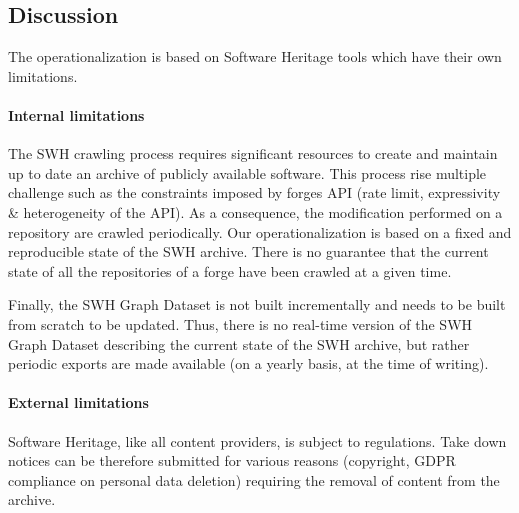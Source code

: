 \subsection{Discussion} 
\label{sec:discussion}
The operationalization is based on Software Heritage tools which have their own limitations.

\paragraph{Internal limitations}
The SWH crawling process requires significant resources to create and maintain up to date an archive of publicly available software. This process rise multiple challenge such as the constraints imposed by forges API (rate limit, expressivity \& heterogeneity of the API). As a consequence, the modification performed on a repository are crawled periodically. Our operationalization is based on a fixed and reproducible state of the SWH archive. There is no guarantee that the current state of all the repositories of a forge have been crawled at a given time.

Finally, the SWH Graph Dataset is not built incrementally and needs to be built from scratch to be updated. Thus, there is no real-time version of the SWH Graph Dataset describing the current state of the SWH archive, but rather periodic exports are made available (on a yearly basis, at the time of writing). 

\paragraph{External limitations}
Software Heritage, like all content providers, is subject to regulations. Take down notices can be therefore submitted for various reasons (copyright, GDPR compliance on personal data deletion) requiring the removal of content from the archive. 
